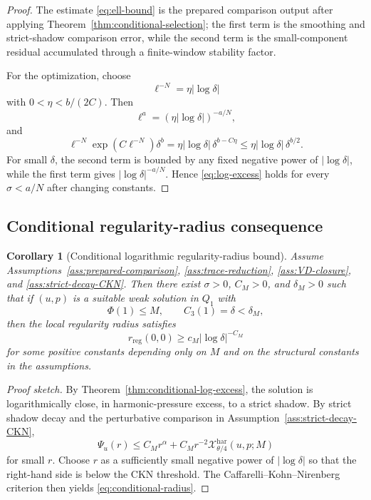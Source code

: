 \documentclass[11pt]{article}
\numberwithin{equation}{section}
\newtheorem{corollary}[theorem]{Corollary}
\newcommand{\reg}{\mathrm{reg}}
\newcommand{\har}{\mathrm{har}}
\newcommand{\calX}{\mathcal X}
\begin{document}
\begin{proof}
The estimate \eqref{eq:ell-bound} is the prepared comparison output after applying Theorem~\ref{thm:conditional-selection}; the first term is the smoothing and strict-shadow comparison error, while the second term is the small-component residual accumulated through a finite-window stability factor.

For the optimization, choose
\[
\ell^{-N}=\eta|\log\delta|
\]
with \(0<\eta<b/(2C)\).  Then
\[
\ell^a=(\eta|\log\delta|)^{-a/N},
\]
and
\[
\ell^{-N}\exp(C\ell^{-N})\delta^b
=
\eta|\log\delta|\,\delta^{b-C\eta}
\le
\eta|\log\delta|\,\delta^{b/2}.
\]
For small \(\delta\), the second term is bounded by any fixed negative power of \(|\log\delta|\), while the first term gives \(|\log\delta|^{-a/N}\).  Hence \eqref{eq:log-excess} holds for every \(\sigma<a/N\) after changing constants.
\end{proof}

\subsection{Conditional regularity-radius consequence}

\begin{corollary}[Conditional logarithmic regularity-radius bound]\label{cor:conditional-radius}
Assume Assumptions~\ref{ass:prepared-comparison}, \ref{ass:trace-reduction}, \ref{ass:VD-closure}, and \ref{ass:strict-decay-CKN}.  Then there exist \(\sigma>0\), \(C_M>0\), and \(\delta_M>0\) such that if \((u,p)\) is a suitable weak solution in \(Q_1\) with
\[
\Phi(1)\le M,
\qquad
C_3(1)=\delta<\delta_M,
\]
then the local regularity radius satisfies
\begin{equation}\label{eq:conditional-radius}
r_{\reg}(0,0)
\ge
c_M|\log\delta|^{-C_M}
\end{equation}
for some positive constants depending only on \(M\) and on the structural constants in the assumptions.
\end{corollary}

\begin{proof}[Proof sketch]
By Theorem~\ref{thm:conditional-log-excess}, the solution is logarithmically close, in harmonic-pressure excess, to a strict shadow.  By strict shadow decay and the perturbative comparison in Assumption~\ref{ass:strict-decay-CKN},
\[
\Psi_u(r)
\le
C_M r^\alpha + C_M r^{-2}\calX^{\har}_{\theta/4}(u,p;M)
\]
for small \(r\).  Choose \(r\) as a sufficiently small negative power of \(|\log\delta|\) so that the right-hand side is below the CKN threshold.  The Caffarelli--Kohn--Nirenberg criterion then yields \eqref{eq:conditional-radius}.
\end{proof}
\end{document}
